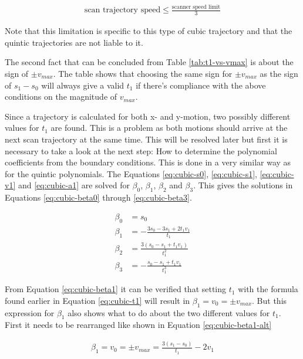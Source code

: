 \begin{align}
    \text{scan trajectory speed} \leq \frac{\text{scanner speed limit}}{3} \label{eq:speed-limit-v1}
\end{align}

Note that this limitation is specific to this type of cubic trajectory and that the quintic trajectories are not liable to it.

The second fact that can be concluded from Table \ref{tab:t1-vs-vmax} is about the sign of $\pm v_{max}$. The table shows that choosing the same sign for $\pm v_{max}$ as the sign of $s_1 - s_0$ will always give a valid $t_1$ if there's compliance with the above conditions on the magnitude of $v_{max}$.

Since a trajectory is calculated for both x- and y-motion, two possibly different values for $t_1$ are found. This is a problem as both motions should arrive at the next scan trajectory at the same time. This will be resolved later but first it is necessary to take a look at the next step: How to determine the polynomial coefficients from the boundary conditions. This is done in a very similar way as for the quintic polynomials. The Equations \ref{eq:cubic-s0}, \ref{eq:cubic-s1}, \ref{eq:cubic-v1} and \ref{eq:cubic-a1} are solved for $\beta_0$, $\beta_1$, $\beta_2$ and $\beta_3$. This gives the solutions in Equations \ref{eq:cubic-beta0} through \ref{eq:cubic-beta3}.

\begin{align}
    \beta_0 &= s_0 \label{eq:cubic-beta0} \\
    \beta_1 &= -\frac{3s_0 - 3s_1 + 2t_1 v_1}{t_1} \label{eq:cubic-beta1} \\
    \beta_2 &= \frac{3(s_0 - s_1 + t_1 v_1)}{t_1^2} \\
    \beta_3 &= -\frac{s_0 - s_1 + t_1v_1}{t_1^3} \label{eq:cubic-beta3}
\end{align}

From Equation \ref{eq:cubic-beta1} it can be verified that setting $t_1$ with the formula found earlier in Equation \ref{eq:cubic-t1} will result in $\beta_1 = v_0 = \pm v_{max}$. But this expression for $\beta_1$ also shows what to do about the two different values for $t_1$. First it needs to be rearranged like shown in Equation \ref{eq:cubic-beta1-alt}

\begin{align}
    \beta_1 = v_0 = \pm v_{max} = \frac{3(s_1 - s_0)}{t_1} - 2 v_1 \label{eq:cubic-beta1-alt}
\end{align}

